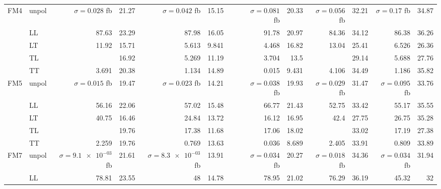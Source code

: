 \begin{table}[h]
{\begin{tabular}{llrrrrrrrrrrrr}
\midrule
\multirow{5}{*}{FM4}
 & unpol & $\sigma = \num{0.028}$ fb & \num{21.27} & $\sigma = \num{0.042}$ fb & \num{15.15} &  &  & $\sigma = \num{0.081}$ fb & \num{20.33} & $\sigma = \num{0.056}$ fb & \num{32.21} & $\sigma = \num{0.17}$ fb & \num{34.87} \\
 & LL & \num{87.63} & \num{23.29} & \num{87.98} & \num{16.05} &  &  & \num{91.78} & \num{20.97} & \num{84.36} & \num{34.12} & \num{86.38} & \num{36.26} \\
 & LT & \num{11.92} & \num{15.71} & \num{5.613} & \num{9.841} &  &  & \num{4.468} & \num{16.82} & \num{13.04} & \num{25.41} & \num{6.526} & \num{26.36} \\
 & TL &  & \num{16.92} & \num{5.269} & \num{11.19} &  &  & \num{3.704} & \num{13.5} &  & \num{29.14} & \num{5.688} & \num{27.76} \\
 & TT & \num{3.691} & \num{20.38} & \num{1.134} & \num{14.89} &  &  & \num{0.015} & \num{9.431} & \num{4.106} & \num{34.49} & \num{1.186} & \num{35.82} \\
\midrule
\multirow{5}{*}{FM5}
 & unpol & $\sigma = \num{0.015}$ fb & \num{19.47} & $\sigma = \num{0.023}$ fb & \num{14.21} &  &  & $\sigma = \num{0.038}$ fb & \num{19.93} & $\sigma = \num{0.029}$ fb & \num{31.47} & $\sigma = \num{0.095}$ fb & \num{33.76} \\
 & LL & \num{56.16} & \num{22.06} & \num{57.02} & \num{15.48} &  &  & \num{66.77} & \num{21.43} & \num{52.75} & \num{33.42} & \num{55.17} & \num{35.55} \\
 & LT & \num{40.75} & \num{16.46} & \num{24.84} & \num{13.72} &  &  & \num{16.12} & \num{16.95} & \num{42.4} & \num{27.75} & \num{26.75} & \num{35.28} \\
 & TL &  & \num{19.76} & \num{17.38} & \num{11.68} &  &  & \num{17.06} & \num{18.02} &  & \num{33.02} & \num{17.19} & \num{27.38} \\
 & TT & \num{2.259} & \num{19.76} & \num{0.769} & \num{13.63} &  &  & \num{0.036} & \num{8.689} & \num{2.405} & \num{33.91} & \num{0.809} & \num{33.89} \\
\midrule
\multirow{5}{*}{FM7}
 & unpol & $\sigma = \num{9.1e-03}$ fb & \num{21.61} & $\sigma = \num{8.3e-03}$ fb & \num{13.91} &  &  & $\sigma = \num{0.034}$ fb & \num{20.27} & $\sigma = \num{0.018}$ fb & \num{34.36} & $\sigma = \num{0.034}$ fb & \num{31.94} \\
 & LL & \num{78.81} & \num{23.55} & \num{48} & \num{14.78} &  &  & \num{78.95} & \num{21.02} & \num{76.29} & \num{36.19} & \num{45.32} & \num{32} \\

\end{tabular}}
\end{table}

